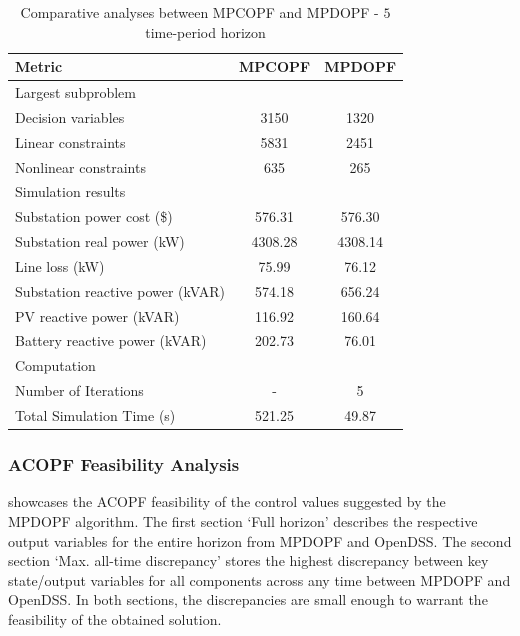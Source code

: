 \documentclass[../../outputs/main.tex]{subfiles}
\begin{document}
\begin{table}[t] %
    \centering
    \caption{Comparative analyses between MPCOPF and MPDOPF - $5$ time-period horizon}
    \begin{tabular}{|l|c|c|}
    \hline
    \textbf{Metric} & \textbf{MPCOPF} & \textbf{MPDOPF} \\ \hline
    Largest subproblem & \multicolumn{2}{c|}{} \\ \hline
    \quad Decision variables & {3150} & {1320} \\ \hline
    \quad Linear constraints & {5831} & {2451} \\ \hline
    \quad Nonlinear constraints & {635} & {265} \\ \hline
    Simulation results  & \multicolumn{2}{c|}{} \\ \hline
    \quad Substation power cost (\$) & 576.31 & 576.30 \\ \hline
    \quad Substation real power (kW) & 4308.28 & 4308.14 \\ \hline
    \quad Line loss (kW) & 75.99 & 76.12 \\ \hline
    \quad Substation reactive power (kVAR) & 574.18 & 656.24 \\ \hline
    \quad PV reactive power (kVAR) & 116.92 & 160.64 \\ \hline
    \quad Battery reactive power (kVAR) & 202.73 & 76.01 \\ \hline
    Computation  & \multicolumn{2}{c|}{} \\ \hline
    \quad Number of Iterations & - & 5 \\ \hline
    \quad Total Simulation Time (s) & 521.25 & 49.87 \\ \hline
    \end{tabular}
    \label{table:opt-5-20-30}
    \vspace{-3mm}
\end{table}

\subsubsection{ACOPF Feasibility Analysis}
 showcases the ACOPF feasibility of the control values suggested by the MPDOPF algorithm. The first section `Full horizon' describes the respective output variables for the entire horizon from MPDOPF and OpenDSS. The second section `Max. all-time discrepancy' stores the highest discrepancy between key state/output variables for all components across any time between MPDOPF and OpenDSS. In both sections, the discrepancies are small enough to warrant the feasibility of the obtained solution. 
\end{document}
